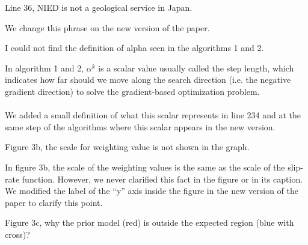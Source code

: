 \documentclass[10pt]{extarticle}
\begin{document}
%
%
\begin{ReviewerComment}{2}
\noindent
 Line 36, NIED is not a geological service in Japan.
\end{ReviewerComment}
%
\begin{Answer}
We change this phrase on the new version of the paper.
 \WorkInProgressRevTask
\end{Answer}
%
%
\begin{ReviewerComment}{2}
\noindent
I could not find the definition of alpha seen in the algorithms 1 and 2.
\end{ReviewerComment}
%
\begin{Answer}
In algorithm 1 and 2, $\alpha^k$ is a scalar value usually called the step length, 
which indicates how far should we move along the search direction (i.e. the negative 
gradient direction) to solve the gradient-based optimization problem.\\
\\
We added a small definition of what this scalar represents in line 234 and at the same step of 
the algorithms where this scalar appears in the new version.
 \WorkInProgressRevTask
\end{Answer}
%
%
\begin{ReviewerComment}{2}
\noindent
 Figure 3b, the scale for weighting value is not shown in the graph.
\end{ReviewerComment}
%
\begin{Answer}
 In figure 3b, the scale of the weighting values is the same as the scale of the slip-rate 
 function. However, we never clarified this fact in the figure or in its caption. We modified 
 the label of the ``y'' axis inside the figure in the new version of the paper to clarify 
 this point.
 \WorkInProgressRevTask
\end{Answer}
%
%
\begin{ReviewerComment}{2}
\noindent
 Figure 3c, why the prior model (red) is outside the expected region (blue with cross)?
\end{ReviewerComment}
%
\end{document}
